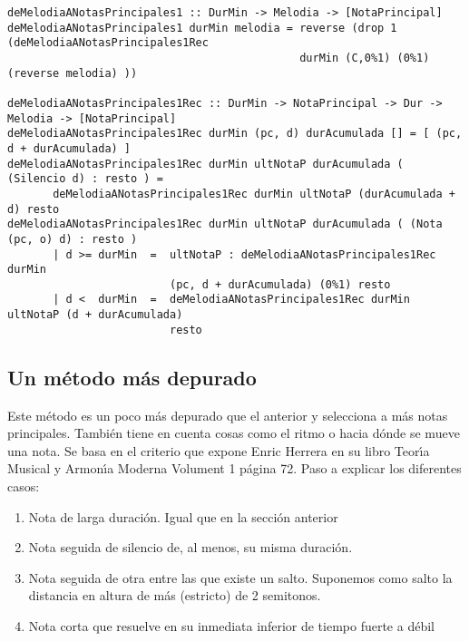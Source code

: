 \documentclass[a4paper]{report}
\begin{document}
\small
\begin{verbatim}
deMelodiaANotasPrincipales1 :: DurMin -> Melodia -> [NotaPrincipal]
deMelodiaANotasPrincipales1 durMin melodia = reverse (drop 1 (deMelodiaANotasPrincipales1Rec 
                                             durMin (C,0%1) (0%1) (reverse melodia) ))

deMelodiaANotasPrincipales1Rec :: DurMin -> NotaPrincipal -> Dur -> Melodia -> [NotaPrincipal]
deMelodiaANotasPrincipales1Rec durMin (pc, d) durAcumulada [] = [ (pc, d + durAcumulada) ]
deMelodiaANotasPrincipales1Rec durMin ultNotaP durAcumulada ( (Silencio d) : resto ) = 
       deMelodiaANotasPrincipales1Rec durMin ultNotaP (durAcumulada + d) resto
deMelodiaANotasPrincipales1Rec durMin ultNotaP durAcumulada ( (Nota (pc, o) d) : resto ) 
       | d >= durMin  =  ultNotaP : deMelodiaANotasPrincipales1Rec durMin 
                         (pc, d + durAcumulada) (0%1) resto
       | d <  durMin  =  deMelodiaANotasPrincipales1Rec durMin ultNotaP (d + durAcumulada) 
                         resto
\end{verbatim}
\normalsize

\subsection{Un m\'etodo m\'as depurado}
Este m\'etodo es un poco m\'as depurado que el anterior y selecciona a m\'as
notas principales. Tambi\'en tiene en cuenta cosas como el ritmo o 
hacia d\'onde se mueve una nota. Se basa en el criterio que expone
Enric Herrera en su libro Teor\'\i a Musical y Armon\'\i a Moderna 
Volument 1 p\'agina 72. Paso a explicar los diferentes casos:
\begin{enumerate}
\item Nota de larga duraci\'on. Igual que en la secci\'on anterior
\item Nota seguida de silencio de, al menos, su misma duraci\'on.
\item Nota seguida de otra entre las que existe un salto. Suponemos como
salto la distancia en altura de m\'as (estricto) de 2 semitonos.
\item Nota corta que resuelve en su inmediata inferior de tiempo fuerte a d\'ebil
\end{enumerate}
\end{document}

